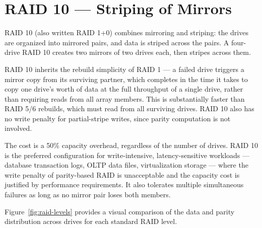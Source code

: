 \section{RAID 10 --- Striping of Mirrors}
RAID 10 (also written RAID 1+0) combines mirroring and striping: the drives are organized into mirrored pairs, and data is striped across the pairs. A four-drive RAID 10 creates two mirrors of two drives each, then stripes across them.

RAID 10 inherits the rebuild simplicity of RAID 1 --- a failed drive triggers a mirror copy from its surviving partner, which completes in the time it takes to copy one drive's worth of data at the full throughput of a single drive, rather than requiring reads from all array members. This is substantially faster than RAID 5/6 rebuilds, which must read from all surviving drives. RAID 10 also has no write penalty for partial-stripe writes, since parity computation is not involved.

The cost is a 50\% capacity overhead, regardless of the number of drives. RAID 10 is the preferred configuration for write-intensive, latency-sensitive workloads --- database transaction logs, OLTP data files, virtualization storage --- where the write penalty of parity-based RAID is unacceptable and the capacity cost is justified by performance requirements. It also tolerates multiple simultaneous failures as long as no mirror pair loses both members.

Figure~\ref{fig:raid-levels} provides a visual comparison of the data and parity distribution across drives for each standard RAID level.

